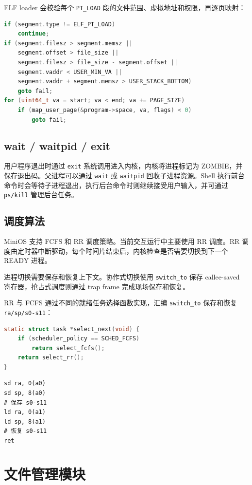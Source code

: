 \documentclass[UTF8,a4paper,12pt,openany,fontset=fandol]{ctexrep}
\begin{document}
ELF loader 会校验每个 \nolinkurl{PT_LOAD} 段的文件范围、虚拟地址和权限，再逐页映射：

\begin{lstlisting}[language=c]
if (segment.type != ELF_PT_LOAD)
    continue;
if (segment.filesz > segment.memsz ||
    segment.offset > file_size ||
    segment.filesz > file_size - segment.offset ||
    segment.vaddr < USER_MIN_VA ||
    segment.vaddr + segment.memsz > USER_STACK_BOTTOM)
    goto fail;
for (uint64_t va = start; va < end; va += PAGE_SIZE)
    if (map_user_page(&program->space, va, flags) < 0)
        goto fail;
\end{lstlisting}

\section{wait / waitpid / exit}

用户程序退出时通过 \nolinkurl{exit} 系统调用进入内核，内核将进程标记为 ZOMBIE，并保存退出码。父进程可以通过 \nolinkurl{wait} 或 \nolinkurl{waitpid} 回收子进程资源。Shell 执行前台命令时会等待子进程退出，执行后台命令时则继续接受用户输入，并可通过 \nolinkurl{ps/kill} 管理后台任务。

\section{调度算法}

MiniOS 支持 FCFS 和 RR 调度策略。当前交互运行中主要使用 RR 调度。RR 调度由定时器中断驱动，每个时间片结束后，内核检查是否需要切换到下一个 READY 进程。

进程切换需要保存和恢复上下文。协作式切换使用 \nolinkurl{switch_to} 保存 callee-saved 寄存器，抢占式调度则通过 trap frame 完成现场保存和恢复。

RR 与 FCFS 通过不同的就绪任务选择函数实现，汇编 \nolinkurl{switch_to} 保存和恢复 \nolinkurl{ra/sp/s0-s11}：

\begin{lstlisting}[language=c]
static struct task *select_next(void) {
    if (scheduler_policy == SCHED_FCFS)
        return select_fcfs();
    return select_rr();
}
\end{lstlisting}

\begin{lstlisting}
sd ra, 0(a0)
sd sp, 8(a0)
# 保存 s0-s11
ld ra, 0(a1)
ld sp, 8(a1)
# 恢复 s0-s11
ret
\end{lstlisting}

\chapter{文件管理模块}
\end{document}
